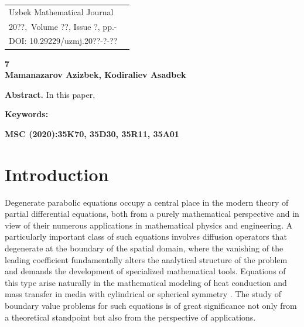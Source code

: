 \documentclass[reqno]{amsart}
\theoremstyle{definition}
\numberwithin{equation}{section}
\begin{document}
\sloppy

\begin{flushright}
	\begin{tabular}{ll}
		\textsf{Uzbek Mathematical Journal} &  \\
		\textsf{20??,\ Volume ??, Issue ?, pp.\pageref{firstpage}-\pageref{lastpage}}\\
		{DOI: 10.29229/uzmj.20??-?-??}\\
\end{tabular}
\end{flushright}



\begin{center}
\textbf{\large 7}\\

\textbf{ Mamanazarov Azizbek, Kodiraliev Asadbek}
\end{center}

\textbf{Abstract.}
In this paper, 

\textbf{Keywords:} 

\textbf{MSC (2020):35K70, 35D30, 35R11, 35A01}


\makeatletter
\renewcommand{\@evenhead}{\vbox{\thepage \hfil {\it Mamanazarov A., Kodiraliyev A.}  \hrule }}
\renewcommand{\@oddhead}{\vbox{\hfill
{\it Inverse coefficient problem }\hfill
\thepage \hrule}} \makeatother

\label{firstpage}



\section{Introduction}





Degenerate parabolic equations occupy a central place in the modern theory of partial
differential equations, both from a purely mathematical perspective and in view of their
numerous applications in mathematical physics and engineering. A particularly important
class of such equations involves diffusion operators that degenerate at the boundary of
the spatial domain, where the vanishing of the leading coefficient fundamentally alters
the analytical structure of the problem and demands the development of specialized
mathematical tools. Equations of this type arise naturally in the mathematical modeling of heat conduction and mass transfer in media with cylindrical or spherical symmetry \cite{Carslaw}. The study of boundary
value problems for such equations is of great significance not only from a theoretical
standpoint but also from the perspective of applications.
 
\end{document}
